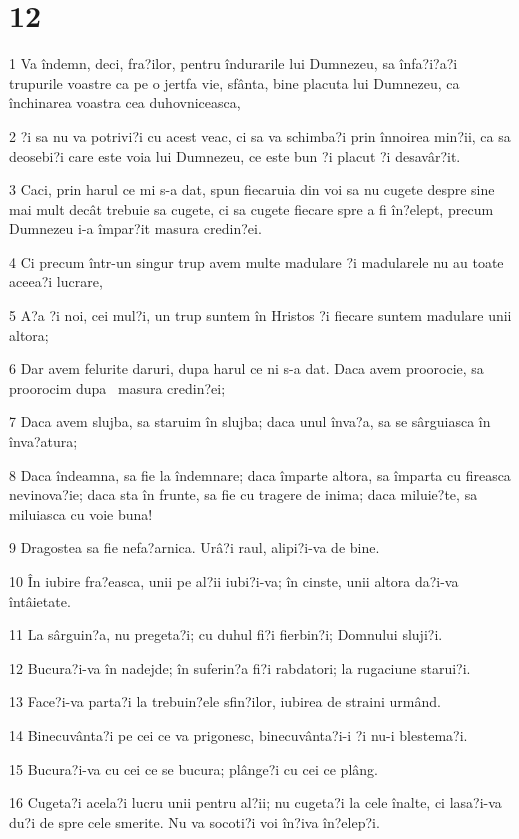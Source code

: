 \chapter{12}

\par 1 Va îndemn, deci, fra?ilor, pentru îndurarile lui Dumnezeu, sa înfa?i?a?i trupurile voastre ca pe o jertfa vie, sfânta, bine placuta lui Dumnezeu, ca închinarea voastra cea duhovniceasca,
\par 2 ?i sa nu va potrivi?i cu acest veac, ci sa va schimba?i prin înnoirea min?ii, ca sa deosebi?i care este voia lui Dumnezeu, ce este bun ?i placut ?i desavâr?it.
\par 3 Caci, prin harul ce mi s-a dat, spun fiecaruia din voi sa nu cugete despre sine mai mult decât trebuie sa cugete, ci sa cugete fiecare spre a fi în?elept, precum Dumnezeu i-a împar?it masura credin?ei.
\par 4 Ci precum într-un singur trup avem multe madulare ?i madularele nu au toate aceea?i lucrare,
\par 5 A?a ?i noi, cei mul?i, un trup suntem în Hristos ?i fiecare suntem madulare unii altora;
\par 6 Dar avem felurite daruri, dupa harul ce ni s-a dat. Daca avem proorocie, sa proorocim dupa  masura credin?ei;
\par 7 Daca avem slujba, sa staruim în slujba; daca unul înva?a, sa se sârguiasca în înva?atura;
\par 8 Daca îndeamna, sa fie la îndemnare; daca împarte altora, sa împarta cu fireasca nevinova?ie; daca sta în frunte, sa fie cu tragere de inima; daca miluie?te, sa miluiasca cu voie buna!
\par 9 Dragostea sa fie nefa?arnica. Urâ?i raul, alipi?i-va de bine.
\par 10 În iubire fra?easca, unii pe al?ii iubi?i-va; în cinste, unii altora da?i-va întâietate.
\par 11 La sârguin?a, nu pregeta?i; cu duhul fi?i fierbin?i; Domnului sluji?i.
\par 12 Bucura?i-va în nadejde; în suferin?a fi?i rabdatori; la rugaciune starui?i.
\par 13 Face?i-va parta?i la trebuin?ele sfin?ilor, iubirea de straini urmând.
\par 14 Binecuvânta?i pe cei ce va prigonesc, binecuvânta?i-i ?i nu-i blestema?i.
\par 15 Bucura?i-va cu cei ce se bucura; plânge?i cu cei ce plâng.
\par 16 Cugeta?i acela?i lucru unii pentru al?ii; nu cugeta?i la cele înalte, ci lasa?i-va du?i de spre cele smerite. Nu va socoti?i voi în?iva în?elep?i.
